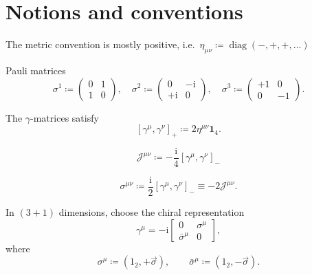 \documentclass[12pt]{article}
\newcommand\mi{\mathrm{i}} %
\DeclareMathOperator{\diag}{diag}
\newcommand{\rbr}[1]{{\left(#1\right)}}
\newcommand{\sbr}[1]{{\left[#1\right]}}
\newcommand{\rfun}[2]{{#1}\mathopen{}\left(#2\right)\mathclose{}}
\begin{document}
\section{Notions and conventions}


The metric convention is mostly positive, i.e.\
$\eta_{\mu\nu} \coloneqq \rfun{\diag}{-, +, +, \ldots}$

Pauli matrices
\begin{equation}
\sigma^1 \coloneqq \begin{pmatrix} 0 & 1 \\ 1 & 0 \end{pmatrix},\quad
\sigma^2 \coloneqq \begin{pmatrix} 0 & -\mi \\ +\mi & 0 \end{pmatrix},\quad
\sigma^3 \coloneqq \begin{pmatrix} +1 & 0 \\ 0 & -1 \end{pmatrix}.
\end{equation}

The $\gamma$-matrices satisfy \cite[sec.~5]{weinberg1995}
\begin{equation}
\sbr{\gamma^\mu, \gamma^\nu}_+ \coloneqq 2\eta^{\mu\nu} \mathbf{1}_4.
\end{equation}

\begin{equation}
\mathscr{J}^{\mu\nu} \coloneqq -\frac{\mi}{4}\sbr{\gamma^\mu, \gamma^\nu}_-
\end{equation}

\begin{equation}
\sigma^{\mu\nu} \coloneqq \frac{\mi}{2}\sbr{\gamma^\mu, \gamma^\nu}_-
\equiv -2 \mathscr{J}^{\mu\nu}.
\end{equation}

In $\rbr{3+1}$ dimensions, choose the chiral representation
\begin{equation}
\gamma^\mu = -\mi
\begin{bmatrix}0 & \sigma^\mu \\ \bar\sigma^\mu & 0\end{bmatrix},
\end{equation}
where
\begin{equation}
\sigma^\mu \coloneqq \rbr{1_2, +\vec{\sigma}},\qquad
\bar\sigma^\mu \coloneqq \rbr{1_2, -\vec{\sigma}}.
\end{equation}
\end{document}
